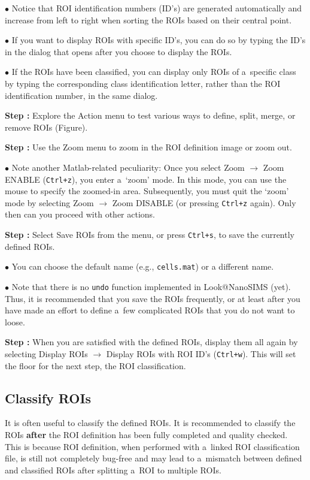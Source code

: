 \documentclass[a4paper, 11pt]{article}
\newcommand{\ttt}[1]{\texttt{#1}}
\newcommand{\lans}[1]{{\color{magenta}#1}}
\newcommand\ra{\rightarrow}
\newcounter{step}
\newcommand\s{\addtocounter{step}{1}\noindent\textbf{Step \thestep:}{ }}
\newcommand\bul{\noindent$\bullet${ }}
\newcommand\bb[1]{\textbf{#1}}
\begin{document}
\bul Notice that ROI identification numbers (ID's) are generated automatically and increase from left to right when sorting the ROIs based on their central point.

\bul If you want to display ROIs with specific ID's, you can do so by typing the ID's in the dialog that opens after you choose to display the ROIs.

\bul If the ROIs have been classified, you can display only ROIs of a~specific class by typing the corresponding class identification letter, rather than the ROI identification number, in the same dialog.

\s Explore the \lans{Action} menu to test various ways to \lans{define}, \lans{split}, \lans{merge}, or \lans{remove} ROIs (Figure).

\s Use the \lans{Zoom} menu to zoom in the ROI definition image or zoom out.

\bul Note another Matlab-related peculiarity: Once you select \lans{Zoom} $\ra$ \lans{Zoom ENABLE} (\ttt{Ctrl+z}), you enter a~`zoom' mode. In this mode, you can use the mouse to specify the zoomed-in area. Subsequently, you must quit the `zoom' mode by selecting \lans{Zoom} $\ra$ \lans{Zoom DISABLE} (or pressing \ttt{Ctrl+z} again). Only then can you proceed with other actions.

\s Select \lans{Save ROIs} from the menu, or press \ttt{Ctrl+s}, to save the currently defined ROIs. 

\bul You can choose the default name (e.g., \ttt{cells.mat}) or a different name.

\bul Note that there is no \ttt{undo} function implemented in Look@NanoSIMS (yet). Thus, it is recommended that you save the ROIs frequently, or at least after you have made an effort to define a~few complicated ROIs that you do not want to loose.

\s When you are satisfied with the defined ROIs, display them all again by selecting \lans{Display ROIs} $\ra$ \lans{Display ROIs with ROI ID's} (\ttt{Ctrl+w}). This will set the floor for the next step, the ROI classification.


\subsection{Classify ROIs}

It is often useful to classify the defined ROIs. It is recommended to classify the ROIs \bb{after} the ROI definition has been fully completed and quality checked. This is because ROI definition, when performed with a~linked ROI classification file, is still not completely bug-free and may lead to a~mismatch between defined and classified ROIs after splitting a~ROI to multiple ROIs.
\end{document}
